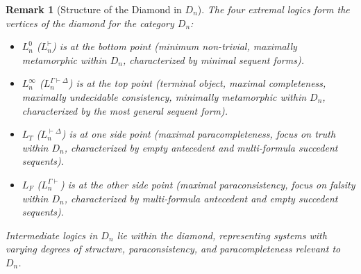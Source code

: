 \documentclass{article}
\newtheorem{remark}{Remark}[section] %
\newcommand{\LT}{L_T} %
\newcommand{\LF}{L_F} %
\begin{document}
																																																																											\begin{remark}[Structure of the Diamond in $D_n$]
																																																																												The four extremal logics form the vertices of the diamond for the category $D_n$:
																																																																												\begin{itemize}
																																																																													\item $L^0_n$ ($L^{\vdash}_n$) is at the bottom point (minimum non-trivial, maximally metamorphic within $D_n$, characterized by minimal sequent forms).
																																																																													\item $L^\infty_n$ ($L^{\Gamma\vdash\Delta}_n$) is at the top point (terminal object, maximal completeness, maximally undecidable consistency, minimally metamorphic within $D_n$, characterized by the most general sequent form).
																																																																													\item $\LT$ ($L^{\vdash\Delta}_n$) is at one side point (maximal paracompleteness, focus on truth within $D_n$, characterized by empty antecedent and multi-formula succedent sequents).
																																																																													\item $\LF$ ($L^{\Gamma\vdash}_n$) is at the other side point (maximal paraconsistency, focus on falsity within $D_n$, characterized by multi-formula antecedent and empty succedent sequents).
																																																																													\end{itemize}
																																																																														Intermediate logics in $D_n$ lie within the diamond, representing systems with varying degrees of structure, paraconsistency, and paracompleteness relevant to $D_n$.
																																																																														

\end{remark}
\end{document}

